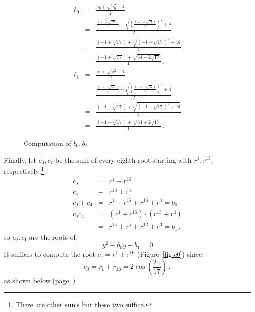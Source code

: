 \documentclass[11pt,a4paper]{article}
\newenvironment{form}[1]{%
\begin{displaymath}%
\renewcommand{\arraystretch}{#1}%
\begin{array}{lcl}}%
{\end{array}%
\end{displaymath}%
}
\newcommand*{\disfrac}[2]{\displaystyle\frac{#1}{#2}}
\begin{document}
\begin{figure}
\begin{form}{2.7}
b_0&=&\disfrac{a_0+\sqrt{a_0^2+4}}{2}\\
&=&\disfrac{
     \disfrac{(-1+\sqrt{17})}{2} + 
     \sqrt{\left(\disfrac{(-1+\sqrt{17})}{2}\right)^2+4}
   }{2}\\
&=&\disfrac{
     (-1+\sqrt{17}) + 
     \sqrt{\left(-1+\sqrt{17}\right)^2+16}
   }{4}\\
&=&\disfrac{
     (-1+\sqrt{17}) + 
     \sqrt{34-2\sqrt{17}}
   }{4}\,,\\
b_1&=&\disfrac{a_1+\sqrt{a_1^2+4}}{2}\\
&=&\disfrac{
     \disfrac{(-1-\sqrt{17})}{2} + 
     \sqrt{\left(\disfrac{(-1-\sqrt{17})}{2}\right)^2+4}
   }{2}\\
&=&\disfrac{
     (-1-\sqrt{17}) + 
     \sqrt{\left(-1-\sqrt{17}\right)^2+16}
   }{4}\\
&=&\disfrac{
     (-1-\sqrt{17}) + 
     \sqrt{34+2\sqrt{17}}
   }{4}\,.
\end{form}\vspace{-2em}
\caption{Computation of $b_0,b_1$}\label{fig.b01}
\end{figure}
Finally, let $c_0,c_4$ be the sum of every eighth root starting with $r^1,r^{13}$, respectively:\footnote{There are other sums but these two suffice.}
\begin{form}{1.4}
c_0&=&r^1+r^{16}\\
c_4&=&r^{13}+r^4\\
c_0+c_4&=&r^1+r^{16}+r^{13}+r^4=b_0\\
c_0c_4&=&(r^1+r^{16})\cdot(r^{13}+r^4)\\
&=&r^{14}+r^5+r^{12}+r^3=b_1\,,
\end{form}
so $c_0,c_4$ are the roots of:
\[
y^2-b_0y+b_1=0
\]
It suffices to compute the root $c_0=r^1+r^{16}$
(Figure~\ref{fig.c0}) since:
\[
c_0=r_1+r_{16}=2\cos\left(\frac{2\pi}{17}\right)\,,
\]
as shown below (page~\pageref{page.cosine}).
\end{document}
